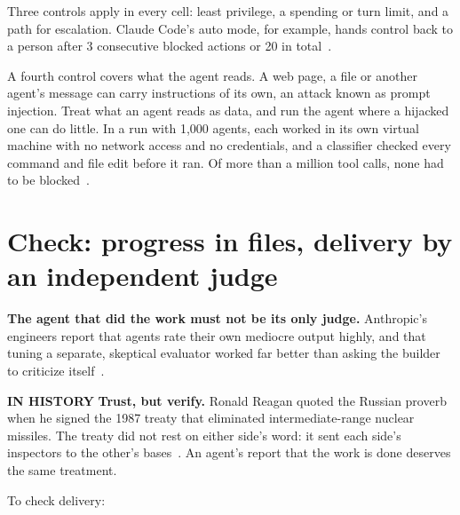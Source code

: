 \documentclass[11pt,letterpaper]{article}
\newcommand{\takeaway}[1]{\textbf{#1}}
\newcommand{\histlabel}[1]{{\sffamily\fontsize{7.6}{9.6}\selectfont\bfseries\color{muted}IN HISTORY}%
  \enspace\textbf{#1}\enspace}
\begin{document}
Three controls apply in every cell: least privilege, a spending or turn limit, and a path for
escalation. Claude Code's auto mode, for example, hands control back to a person after 3
consecutive blocked actions or 20 in total~\cite{automode}.

A fourth control covers what the agent reads. A web page, a file or another agent's message
can carry instructions of its own, an attack known as prompt injection. Treat what an agent
reads as data, and run the agent where a hijacked one can do little. In a run with 1,000
agents, each worked in its own virtual machine with no network access and no credentials, and
a classifier checked every command and file edit before it ran. Of more than a million tool
calls, none had to be blocked~\cite{fermat}.

\section{Check: progress in files, delivery by an independent judge}\label{sec:check}

\takeaway{The agent that did the work must not be its only judge.} Anthropic's engineers
report that agents rate their own mediocre output highly, and that tuning a separate,
skeptical evaluator worked far better than asking the builder to criticize
itself~\cite{harness}.

\begin{history}
\histlabel{Trust, but verify.} Ronald Reagan quoted the Russian proverb when he signed the
1987 treaty that eliminated intermediate-range nuclear missiles. The treaty did not rest on
either side's word: it sent each side's inspectors to the other's bases~\cite{reagan}. An
agent's report that the work is done deserves the same treatment.
\end{history}

To check delivery:
\end{document}
